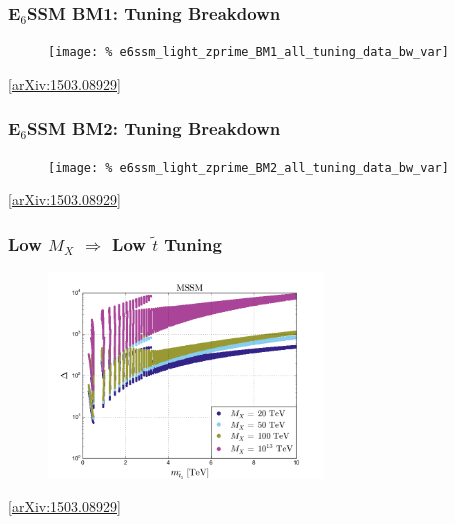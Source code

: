 \documentclass[10pt,aspectratio=169]{beamer}
\begin{document}
\begin{frame}
  \frametitle{E$_6$SSM BM1: Tuning Breakdown}
  \begin{figure}
    \texttt{[image: \%
      e6ssm\_light\_zprime\_BM1\_all\_tuning\_data\_bw\_var]}
  \end{figure}
  \begin{center}
    \tiny [\href{https://arxiv.org/abs/1503.08929}{arXiv:1503.08929}]
  \end{center}
\end{frame}

\begin{frame}
  \frametitle{E$_6$SSM BM2: Tuning Breakdown}
  \begin{figure}
    \texttt{[image: \%
      e6ssm\_light\_zprime\_BM2\_all\_tuning\_data\_bw\_var]}
  \end{figure}
  \begin{center}
    \tiny [\href{https://arxiv.org/abs/1503.08929}{arXiv:1503.08929}]
  \end{center}
\end{frame}

\begin{frame}
  \frametitle{Low $M_X$ $\Rightarrow$ Low $\tilde{t}$ Tuning}
  \begin{figure}
    \includegraphics[width=0.65\textwidth]{mssm_stop_tuning_bw_var}
  \end{figure}
  \begin{center}
    \tiny [\href{https://arxiv.org/abs/1503.08929}{arXiv:1503.08929}]
  \end{center}
\end{frame}
\end{document}
